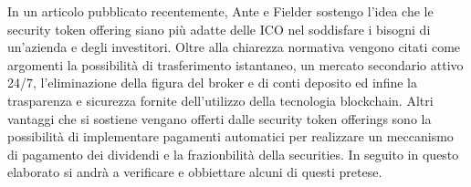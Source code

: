 In un articolo pubblicato recentemente, Ante e Fielder\cite{K35} sostengo l'idea che le security token offering siano più adatte delle ICO nel soddisfare i bisogni di un'azienda e degli investitori. Oltre alla chiarezza normativa vengono citati come argomenti la possibilità di trasferimento istantaneo, un mercato secondario attivo 24/7, l'eliminazione della figura del broker e di conti deposito ed infine la trasparenza e sicurezza fornite dell'utilizzo della tecnologia blockchain.\cite{K30} Altri vantaggi che si sostiene vengano offerti dalle security token offerings sono la possibilità di implementare pagamenti automatici per realizzare un meccanismo di pagamento dei dividendi e la  frazionbilità della securities\cite{K36}. In seguito in questo elaborato si andrà a verificare e obbiettare alcuni di questi pretese.  
